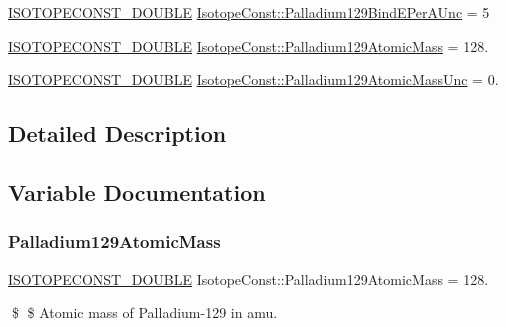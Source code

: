 \begin{DoxyCompactItemize}
\mbox{\hyperlink{group___isotope_const-_macros_ga8f45a7272ce02c0b4c65c44636ed719a}{I\+S\+O\+T\+O\+P\+E\+C\+O\+N\+S\+T\+\_\+\+D\+O\+U\+B\+LE}} \mbox{\hyperlink{group___isotope_const-_palladium-_pd129_ga2af70c17a3dd3368fed2249582d52c4e}{Isotope\+Const\+::\+Palladium129\+Bind\+E\+Per\+A\+Unc}} = 5
\item 
\mbox{\hyperlink{group___isotope_const-_macros_ga8f45a7272ce02c0b4c65c44636ed719a}{I\+S\+O\+T\+O\+P\+E\+C\+O\+N\+S\+T\+\_\+\+D\+O\+U\+B\+LE}} \mbox{\hyperlink{group___isotope_const-_palladium-_pd129_gad6b6f09608bef7d89a56fad69800ec97}{Isotope\+Const\+::\+Palladium129\+Atomic\+Mass}} = 128.
\item 
\mbox{\hyperlink{group___isotope_const-_macros_ga8f45a7272ce02c0b4c65c44636ed719a}{I\+S\+O\+T\+O\+P\+E\+C\+O\+N\+S\+T\+\_\+\+D\+O\+U\+B\+LE}} \mbox{\hyperlink{group___isotope_const-_palladium-_pd129_ga69118968952f7b9a426fb16452584673}{Isotope\+Const\+::\+Palladium129\+Atomic\+Mass\+Unc}} = 0.
\end{DoxyCompactItemize}


\subsection{Detailed Description}


\subsection{Variable Documentation}
\mbox{\label{group___isotope_const-_palladium-_pd129_gad6b6f09608bef7d89a56fad69800ec97}} 
\subsubsection{\texorpdfstring{Palladium129\+Atomic\+Mass}{Palladium129AtomicMass}}
{\footnotesize\ttfamily \mbox{\hyperlink{group___isotope_const-_macros_ga8f45a7272ce02c0b4c65c44636ed719a}{I\+S\+O\+T\+O\+P\+E\+C\+O\+N\+S\+T\+\_\+\+D\+O\+U\+B\+LE}} Isotope\+Const\+::\+Palladium129\+Atomic\+Mass = 128.}

\$ \$ Atomic mass of Palladium-\/129 in amu. \mbox{\label{group___isotope_const-_palladium-_pd129_ga69118968952f7b9a426fb16452584673}} 
